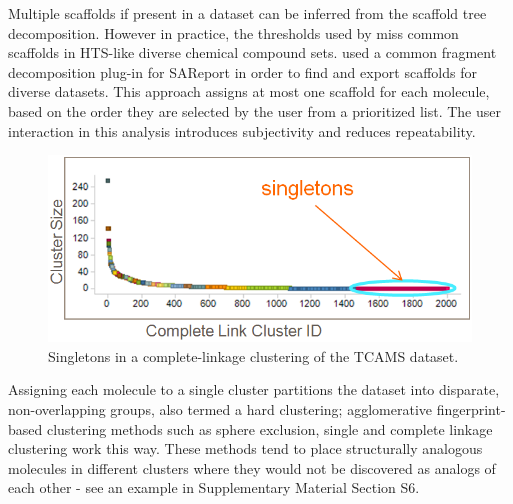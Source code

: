 \documentclass[journal=jacsat,biochem,manuscript=article]{achemso}
\begin{document}

Multiple scaffolds if present in a dataset can be inferred from the
scaffold tree decomposition\cite{ClarkLabute2008SAReport}. However in
practice, the thresholds used by \citet{ClarkLabute2008SAReport}
miss common scaffolds in HTS-like diverse chemical compound
sets. \citet{Bandyopadhyay2012ACS} used a common fragment
decomposition plug-in for SAReport in order to find and export
scaffolds for diverse datasets.  This approach assigns at most one scaffold for
each molecule, based on the order they are selected by the user from a
prioritized list.  The user interaction in this analysis introduces subjectivity and
reduces repeatability.

\begin{figure}
\includegraphics[width=5.5in]{fig/singletons.png}
\caption{Singletons in a complete-linkage clustering of the TCAMS dataset.}
\label{fig:platypus}
\end{figure}

Assigning each molecule to a single cluster partitions the dataset into
disparate, non-overlapping groups, also termed a hard clustering;
agglomerative fingerprint-based clustering methods such as sphere exclusion, single and complete linkage clustering\cite{Downs2003} work this way. These methods tend to place structurally analogous molecules in different clusters where they would not be discovered as analogs of each other - see an example in Supplementary Material Section S6. 
\end{document}
